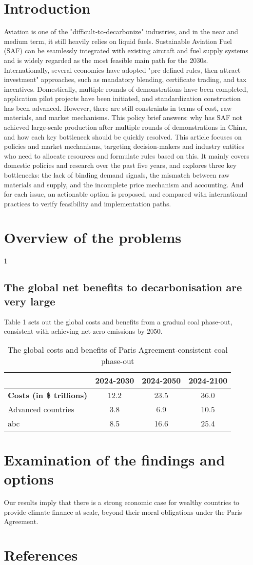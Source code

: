\documentclass[a4paper,11pt]{article}
\begin{document}
\section{Introduction}
Aviation is one of the "difficult-to-decarbonize" industries, and in the near and medium term, it still heavily relies on liquid fuels. Sustainable Aviation Fuel (SAF) can be seamlessly integrated with existing aircraft and fuel supply systems and is widely regarded as the most feasible main path for the 2030s. Internationally, several economies have adopted "pre-defined rules, then attract investment" approaches, such as mandatory blending, certificate trading, and tax incentives. Domestically, multiple rounds of demonstrations have been completed, application pilot projects have been initiated, and standardization construction has been advanced. However, there are still constraints in terms of cost, raw materials, and market mechanisms. This policy brief answers: why has SAF not achieved large-scale production after multiple rounds of demonstrations in China, and how each key bottleneck should be quickly resolved. This article focuses on policies and market mechanisms, targeting decision-makers and industry entities who need to allocate resources and formulate rules based on this. It mainly covers domestic policies and research over the past five years, and explores three key bottlenecks: the lack of binding demand signals, the mismatch between raw materials and supply, and the incomplete price mechanism and accounting. And for each issue, an actionable option is proposed, and compared with international practices to verify feasibility and implementation paths.

\section{Overview of the problems}
1

\subsection{The global net benefits to decarbonisation are very large}
Table 1 sets out the global costs and benefits from a gradual coal phase-out, consistent with achieving net-zero emissions by 2050.

\begin{table}[h]
\centering
\caption{The global costs and benefits of Paris Agreement-consistent coal phase-out}
\begin{tabular}{lccc}
\toprule
& 2024-2030 & 2024-2050 & 2024-2100 \\
\midrule
\textbf{Costs (in \$ trillions)} & 12.2 & 23.5 & 36.0 \\
\quad Advanced countries & 3.8 & 6.9 & 10.5 \\
\quad abc & 8.5 & 16.6 & 25.4 \\
\bottomrule
\end{tabular}
\end{table}

\section{Examination of the findings and options}
Our results imply that there is a strong economic case for wealthy countries to provide climate finance at scale, beyond their moral obligations under the Paris Agreement.


\section{References}
\end{document}
